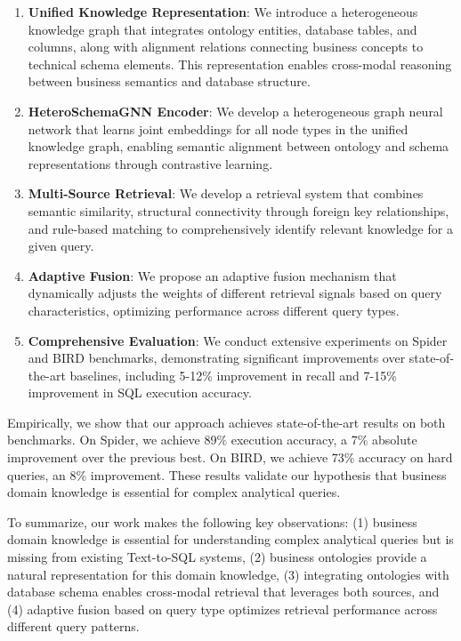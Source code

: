 \documentclass[sigconf, nonatbib]{acmart}
\begin{document}
\begin{enumerate}
    \item \textbf{Unified Knowledge Representation}: We introduce a heterogeneous knowledge graph that integrates ontology entities, database tables, and columns, along with alignment relations connecting business concepts to technical schema elements. This representation enables cross-modal reasoning between business semantics and database structure.
    
    \item \textbf{HeteroSchemaGNN Encoder}: We develop a heterogeneous graph neural network that learns joint embeddings for all node types in the unified knowledge graph, enabling semantic alignment between ontology and schema representations through contrastive learning.
    
    \item \textbf{Multi-Source Retrieval}: We develop a retrieval system that combines semantic similarity, structural connectivity through foreign key relationships, and rule-based matching to comprehensively identify relevant knowledge for a given query.
    
    \item \textbf{Adaptive Fusion}: We propose an adaptive fusion mechanism that dynamically adjusts the weights of different retrieval signals based on query characteristics, optimizing performance across different query types.
    
    \item \textbf{Comprehensive Evaluation}: We conduct extensive experiments on Spider and BIRD benchmarks, demonstrating significant improvements over state-of-the-art baselines, including 5-12\% improvement in recall and 7-15\% improvement in SQL execution accuracy.
\end{enumerate}

Empirically, we show that our approach achieves state-of-the-art results on both benchmarks. On Spider, we achieve 89\% execution accuracy, a 7\% absolute improvement over the previous best. On BIRD, we achieve 73\% accuracy on hard queries, an 8\% improvement. These results validate our hypothesis that business domain knowledge is essential for complex analytical queries.

To summarize, our work makes the following key observations: (1) business domain knowledge is essential for understanding complex analytical queries but is missing from existing Text-to-SQL systems, (2) business ontologies provide a natural representation for this domain knowledge, (3) integrating ontologies with database schema enables cross-modal retrieval that leverages both sources, and (4) adaptive fusion based on query type optimizes retrieval performance across different query patterns.
\end{document}
